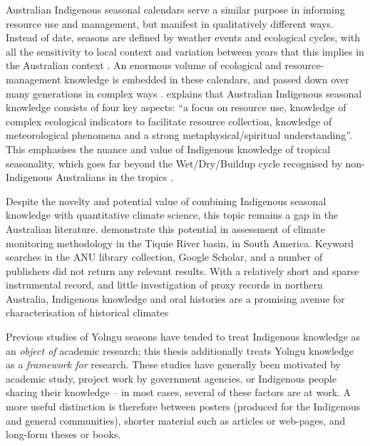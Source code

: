 Australian Indigenous seasonal calendars serve a similar purpose in informing
resource use and management, but manifest in qualitatively different ways.
Instead of date, seasons are defined by weather events and ecological cycles,
with all the sensitivity to local context and variation between years that
this implies in the Australian context \citep{davis1989}.  An enormous volume of ecological and
resource-management knowledge is embedded in these calendars, and passed
down over many generations in complex ways \citep{barber2005}.
%
\citet{woodward2012b} explains that Australian Indigenous seasonal knowledge
consists of four key aspects: ``a focus on resource use, knowledge of complex
ecological indicators to facilitate resource collection, knowledge of
meteorological phenomena and a strong metaphysical/spiritual understanding''.
This emphasises the nuance and value of Indigenous knowledge of tropical
seasonality, which goes far beyond the Wet/Dry/Buildup cycle recognised
by non-Indigenous Australians in the tropics \citep{kingsley2003}.


Despite the novelty and potential value of combining Indigenous seasonal
knowledge with quantitative climate science, this topic remains a gap
in the Australian literature.  \citet{cochran2015} demonstrate this potential
in assessment of climate monitoring methodology in the Tiquie River basin,
in South America.  Keyword searches in the ANU library collection, Google
Scholar, and a number of publishers did not return any relevant results.
With a relatively short and sparse instrumental record, and little investigation
of proxy records in northern Australia, Indigenous knowledge and oral histories
are a promising avenue for characterisation of historical climates


Previous studies of Yolngu seasons have tended to treat Indigenous knowledge
as an \emph{object of} academic research; this thesis additionally treats
Yolngu knowledge as a \emph{framework for} research.  These studies have generally
been motivated by academic study, project work by government agencies, or
Indigenous people sharing their knowledge -- in most cases, several of these
factors are at work.  A more useful distinction is therefore between posters
(produced for the Indigenous and general communities), shorter material such
as articles or web-pages, and long-form theses or books.

